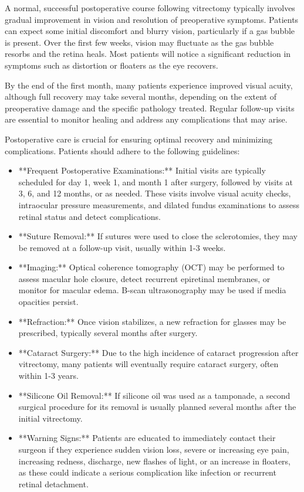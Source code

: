 A normal, successful postoperative course following vitrectomy typically involves gradual improvement in vision and resolution of preoperative symptoms. Patients can expect some initial discomfort and blurry vision, particularly if a gas bubble is present. Over the first few weeks, vision may fluctuate as the gas bubble resorbs and the retina heals. Most patients will notice a significant reduction in symptoms such as distortion or floaters as the eye recovers. 

By the end of the first month, many patients experience improved visual acuity, although full recovery may take several months, depending on the extent of preoperative damage and the specific pathology treated. Regular follow-up visits are essential to monitor healing and address any complications that may arise.

Postoperative care is crucial for ensuring optimal recovery and minimizing complications. Patients should adhere to the following guidelines:

\begin{itemize}
  \item **Frequent Postoperative Examinations:** Initial visits are typically scheduled for day 1, week 1, and month 1 after surgery, followed by visits at 3, 6, and 12 months, or as needed. These visits involve visual acuity checks, intraocular pressure measurements, and dilated fundus examinations to assess retinal status and detect complications.
  
  \item **Suture Removal:** If sutures were used to close the sclerotomies, they may be removed at a follow-up visit, usually within 1-3 weeks.
  
  \item **Imaging:** Optical coherence tomography (OCT) may be performed to assess macular hole closure, detect recurrent epiretinal membranes, or monitor for macular edema. B-scan ultrasonography may be used if media opacities persist.
  
  \item **Refraction:** Once vision stabilizes, a new refraction for glasses may be prescribed, typically several months after surgery.
  
  \item **Cataract Surgery:** Due to the high incidence of cataract progression after vitrectomy, many patients will eventually require cataract surgery, often within 1-3 years.
  
  \item **Silicone Oil Removal:** If silicone oil was used as a tamponade, a second surgical procedure for its removal is usually planned several months after the initial vitrectomy.
  
  \item **Warning Signs:** Patients are educated to immediately contact their surgeon if they experience sudden vision loss, severe or increasing eye pain, increasing redness, discharge, new flashes of light, or an increase in floaters, as these could indicate a serious complication like infection or recurrent retinal detachment.
\end{itemize}

